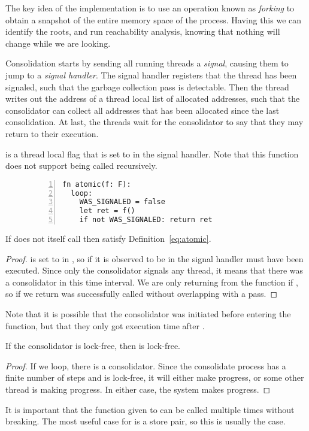 \clearpage
\vspace{2cm}


The key idea of the implementation is to use an operation known as \emph{forking} to obtain a
snapshot of the entire memory space of the process. Having this we can identify the roots, and run
reachability analysis, knowing that nothing will change while we are looking.

Consolidation starts by sending all running threads a \emph{signal}, causing them to jump to a
\emph{signal handler}. The signal handler registers that the thread has been signaled, such that the
garbage collection pass is detectable. Then the thread writes out the address of a thread local
list of allocated addresses, such that the consolidator can collect all addresses that has been
allocated since the last consolidation. At last, the threads wait for the consolidator to say that
they may return to their execution. 


   is a thread local flag that is
  set to  in the signal handler. Note that this function does not support being called
  recursively.
\begin{figure}[ht]
  \begin{lstlisting}[numbers=left,numberstyle=\color{gray}\ttfamily{}A,caption=Pseudocode of $atomic$]
fn atomic(f: F):
  loop:
    WAS_SIGNALED = false
    let ret = f()
    if not WAS_SIGNALED: return ret
\end{lstlisting}
\end{figure}

\begin{theorem}
  If  does not itself call  then  satisfy
  Definition~\ref{eq:atomic}.
\end{theorem}
\begin{proof}
   is set to  in , so if it is observed to be
   in  the signal handler must have been executed. Since only the consolidator
  signals any thread, it means that there was a consolidator in this time interval. We are only
  returning from the function if , so if we return  was
  successfully called without overlapping with a pass.
\end{proof}
Note that it is possible that the consolidator was initiated before entering the 
function, but that they only got execution time after .
\begin{lemma}
  If the consolidator is lock-free, then  is lock-free.
\end{lemma}
\begin{proof}
  If we loop, there is a consolidator. Since the consolidate process has a finite number of steps
  and is lock-free, it will either make progress, or some other thread is making progress. In
  either case, the system makes progress.
\end{proof}

It is important that the function given to  can be called multiple times without
breaking. The most useful case for  is a  store pair, so this is
usually the case.
